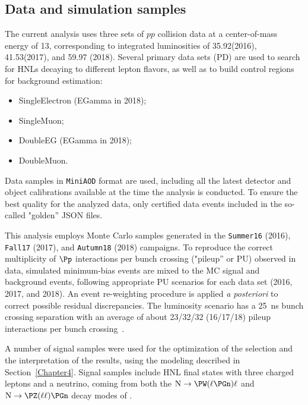 \subsection{Data and simulation samples}
The current analysis uses three sets of $pp$ collision data at a
center-of-mass energy of 13\TeV, corresponding to integrated
luminosities of 35.92\fbinv (2016), 41.53\fbinv (2017), and 59.97\fbinv
(2018). Several primary data sets (PD) are used to search for HNLs decaying
to different lepton flavors, as well as to build control regions for
background estimation:
\begin{itemize}
\setlength\itemsep{-0.1em}
\item SingleElectron (EGamma in 2018);
\item SingleMuon;
\item DoubleEG (EGamma in 2018);
\item DoubleMuon.
\end{itemize}

Data samples in \texttt{MiniAOD} format are used, including all the
latest detector and object calibrations available at the time
the analysis is conducted.
To ensure the best quality for the analyzed data, only certified data
events included in the so-called "golden'' JSON files.

This analysis employs Monte Carlo samples generated in the
\texttt{Summer16} (2016), \texttt{Fall17} (2017), and
\texttt{Autumn18} (2018) campaigns.
To reproduce the correct multiplicity of $\Pp$ interactions per
bunch crossing ("pileup'' or PU) observed in data,
simulated minimum-bias events are mixed to the MC signal and
background events, following appropriate PU scenarios for each data
set (2016, 2017, and 2018).
An event re-weighting procedure is applied \textit{a posteriori} to
correct possible residual discrepancies. The luminosity scenario has a 25~ns bunch crossing separation with an
average of about 23/32/32 (16/17/18)  pileup interactions per bunch crossing~\cite{Sirunyan:2020foa}. 

A number of signal samples were used for the optimization of the
selection and the interpretation of the results, using the modeling
described in Section~\ref{Chapter4}.
Signal samples include HNL final states  with three charged leptons and a
neutrino, coming from both the
$\hnl\to\PW(\ell\PGn)\ell$ and $\hnl\to\PZ(\ell\ell)\PGn$ decay modes
of \hnl.

